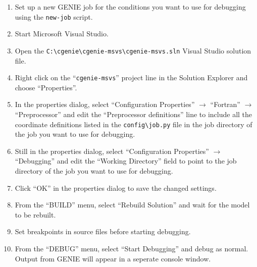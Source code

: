 \documentclass[a4paper,10pt,article]{memoir}
\begin{document}
\begin{enumerate}
  \item{Set up a new GENIE job for the conditions you want to use for
    debugging using the \texttt{new-job} script.}
  \item{Start Microsoft Visual Studio.}
  \item{Open the
    \texttt{C:\textbackslash{}cgenie\textbackslash{}cgenie-msvs\textbackslash{}cgenie-msvs.sln}
    Visual Studio solution file.}
  \item{Right click on the ``\texttt{cgenie-msvs}'' project line in
    the Solution Explorer and choose ``Properties''.}
  \item{In the properties dialog, select ``Configuration Properties''
    $\to$ ``Fortran'' $\to$ ``Preprocessor'' and edit the
    ``Preprocessor definitions'' line to include all the coordinate
    definitions listed in the \texttt{config\textbackslash{}job.py}
    file in the job directory of the job you want to use for
    debugging.}
  \item{Still in the properties dialog, select ``Configuration
    Properties'' $\to$ ``Debugging'' and edit the ``Working
    Directory'' field to point to the job directory of the job you
    want to use for debugging.}
  \item{Click ``OK'' in the properties dialog to save the changed
    settings.}
  \item{From the ``BUILD'' menu, select ``Rebuild Solution'' and wait
    for the model to be rebuilt.}
  \item{Set breakpoints in source files before starting debugging.}
  \item{From the ``DEBUG'' menu, select ``Start Debugging'' and debug
    as normal.  Output from GENIE will appear in a seperate console
    window.}
\end{enumerate}
\end{document}
